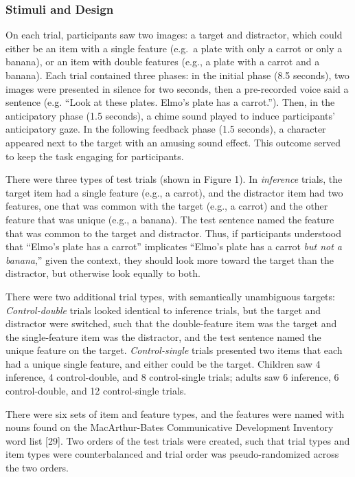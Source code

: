 \documentclass{rsos}
\begin{document}
\subsubsection{Stimuli and Design}\label{stimuli-and-design}

On each trial, participants saw two images: a target and distractor,
which could either be an item with a single feature (e.g.~a plate with
only a carrot or only a banana), or an item with double features (e.g.,
a plate with a carrot and a banana). Each trial contained three phases:
in the initial phase (8.5 seconds), two images were presented in silence
for two seconds, then a pre-recorded voice said a sentence (e.g. ``Look
at these plates. Elmo's plate has a carrot.''). Then, in the
anticipatory phase (1.5 seconds), a chime sound played to induce
participants' anticipatory gaze. In the following feedback phase (1.5
seconds), a character appeared next to the target with an amusing sound
effect. This outcome served to keep the task engaging for participants.

There were three types of test trials (shown in Figure 1). In
\emph{inference} trials, the target item had a single feature (e.g., a
carrot), and the distractor item had two features, one that was common
with the target (e.g., a carrot) and the other feature that was unique
(e.g., a banana). The test sentence named the feature that was common to
the target and distractor. Thus, if participants understood that
``Elmo's plate has a carrot'' implicates ``Elmo's plate has a carrot
\emph{but not a banana},'' given the context, they should look more
toward the target than the distractor, but otherwise look equally to
both.

There were two additional trial types, with semantically unambiguous
targets: \emph{Control-double} trials looked identical to inference
trials, but the target and distractor were switched, such that the
double-feature item was the target and the single-feature item was the
distractor, and the test sentence named the unique feature on the
target. \emph{Control-single} trials presented two items that each had a
unique single feature, and either could be the target. Children saw 4
inference, 4 control-double, and 8 control-single trials; adults saw 6
inference, 6 control-double, and 12 control-single trials.

There were six sets of item and feature types, and the features were
named with nouns found on the MacArthur-Bates Communicative Development
Inventory word list {[}29{]}. Two orders of the test trials were
created, such that trial types and item types were counterbalanced and
trial order was pseudo-randomized across the two orders.
\end{document}

